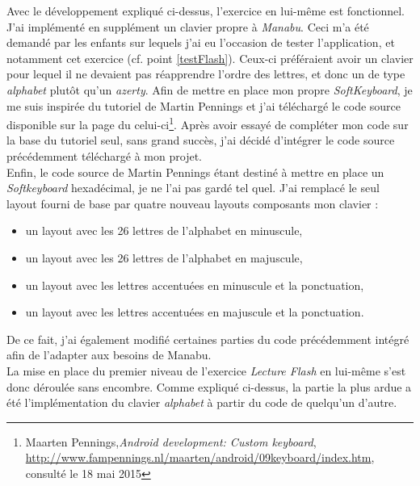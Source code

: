 
Avec le développement expliqué ci-dessus, l'exercice en lui-même est fonctionnel. J'ai implémenté en supplément un clavier propre à \textit{Manabu}\label{clavier}. Ceci m'a été demandé par les enfants sur lequels j'ai eu l'occasion de tester l'application, et notamment cet exercice (cf. point \ref{testFlash}). Ceux-ci préféraient avoir un clavier pour lequel il ne devaient pas réapprendre l'ordre des lettres, et donc un de type \textit{alphabet} plutôt qu'un \textit{azerty}. Afin de mettre en place mon propre \textit{SoftKeyboard}, je me suis inspirée du tutoriel de Martin Pennings et j'ai téléchargé le code source disponible sur la page du celui-ci\footnote{Maarten Pennings,\textit{Android development: Custom keyboard}, \url{http://www.fampennings.nl/maarten/android/09keyboard/index.htm}, consulté le 18 mai 2015}. Après avoir essayé de compléter mon code sur la base du tutoriel seul, sans grand succès, j'ai décidé d'intégrer le code source précédemment téléchargé à mon projet.\\

Enfin, le code source de Martin Pennings étant destiné à mettre en place un \textit{Softkeyboard} hexadécimal, je ne l'ai pas gardé tel quel. J'ai remplacé le seul layout fourni de base par quatre nouveau layouts composants mon clavier :
\begin{itemize}
\item un layout avec les 26 lettres de l'alphabet en minuscule,
\item un layout avec les 26 lettres de l'alphabet en majuscule,
\item un layout avec les lettres accentuées en minuscule et la ponctuation,
\item un layout avec les lettres accentuées en majuscule et la ponctuation.
\end{itemize}
De ce fait, j'ai également modifié certaines parties du code précédemment intégré afin de l'adapter aux besoins de Manabu.\\

La mise en place du premier niveau de l'exercice \textit{Lecture Flash} en lui-même s'est donc déroulée sans encombre. Comme expliqué ci-dessus, la partie la plus ardue a été l'implémentation du clavier \textit{alphabet} à partir du code de quelqu'un d'autre.
	
